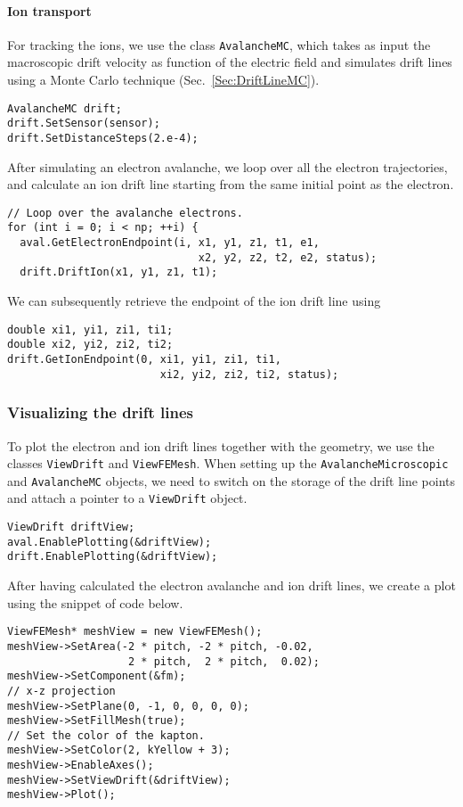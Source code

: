 \paragraph{Ion transport}
For tracking the ions, we use the class \texttt{AvalancheMC}, 
which takes as input the macroscopic drift velocity as 
function of the electric field and simulates drift lines using a 
Monte Carlo technique (Sec.~\ref{Sec:DriftLineMC}).
\begin{lstlisting}
AvalancheMC drift;
drift.SetSensor(sensor);
drift.SetDistanceSteps(2.e-4);
\end{lstlisting}
After simulating an electron avalanche, we loop over all the electron
trajectories, and calculate an ion drift line starting from the same
initial point as the electron.
\begin{lstlisting}
// Loop over the avalanche electrons.
for (int i = 0; i < np; ++i) {
  aval.GetElectronEndpoint(i, x1, y1, z1, t1, e1,
                              x2, y2, z2, t2, e2, status);
  drift.DriftIon(x1, y1, z1, t1);
\end{lstlisting}
We can subsequently retrieve the endpoint of the ion drift line using
\begin{lstlisting}
double xi1, yi1, zi1, ti1;
double xi2, yi2, zi2, ti2;
drift.GetIonEndpoint(0, xi1, yi1, zi1, ti1,
                        xi2, yi2, zi2, ti2, status);
\end{lstlisting}
\subsubsection{Visualizing the drift lines}
To plot the electron and ion drift lines together with the geometry, 
we use the classes \texttt{ViewDrift} and \texttt{ViewFEMesh}. 
When setting up the \texttt{AvalancheMicroscopic} and \texttt{AvalancheMC} 
objects, we need to switch on the storage of the drift line points and 
attach a pointer to a \texttt{ViewDrift} object.
\begin{lstlisting}
ViewDrift driftView;
aval.EnablePlotting(&driftView);
drift.EnablePlotting(&driftView);
\end{lstlisting}
After having calculated the electron avalanche and ion drift lines, we create a plot using the snippet of code below.
\begin{lstlisting}
ViewFEMesh* meshView = new ViewFEMesh();
meshView->SetArea(-2 * pitch, -2 * pitch, -0.02,
                   2 * pitch,  2 * pitch,  0.02);
meshView->SetComponent(&fm);
// x-z projection
meshView->SetPlane(0, -1, 0, 0, 0, 0);
meshView->SetFillMesh(true); 
// Set the color of the kapton.
meshView->SetColor(2, kYellow + 3);
meshView->EnableAxes();
meshView->SetViewDrift(&driftView);
meshView->Plot();
\end{lstlisting}
